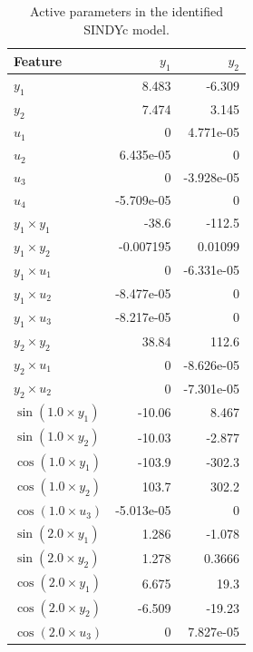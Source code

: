 \documentclass[../main.tex]{subfiles}
\begin{document}
\begin{table}[ht]
\label{tab:sindy_params}
\centering
\begin{tabular}{l r r}
\hline
\textbf{Feature} & \textbf{$y_1$} & \textbf{$y_2$} \\
\hline
$y_1$ & 8.483 & -6.309 \\
$y_2$ & 7.474 & 3.145 \\
$u_1$ & 0 & 4.771e-05 \\
$u_2$ & 6.435e-05 & 0 \\
$u_3$ & 0 & -3.928e-05 \\
$u_4$ & -5.709e-05 & 0 \\
$y_1 \times y_1$ & -38.6 & -112.5 \\
$y_1 \times y_2$ & -0.007195 & 0.01099 \\
$y_1 \times u_1$ & 0 & -6.331e-05 \\
$y_1 \times u_2$ & -8.477e-05 & 0 \\
$y_1 \times u_3$ & -8.217e-05 & 0 \\
$y_2 \times y_2$ & 38.84 & 112.6 \\
$y_2 \times u_1$ & 0 & -8.626e-05 \\
$y_2 \times u_2$ & 0 & -7.301e-05 \\
$\sin(1.0 \times y_1)$ & -10.06 & 8.467 \\
$\sin(1.0 \times y_2)$ & -10.03 & -2.877 \\
$\cos(1.0 \times y_1)$ & -103.9 & -302.3 \\
$\cos(1.0 \times y_2)$ & 103.7 & 302.2 \\
$\cos(1.0 \times u_3)$ & -5.013e-05 & 0 \\
$\sin(2.0 \times y_1)$ & 1.286 & -1.078 \\
$\sin(2.0 \times y_2)$ & 1.278 & 0.3666 \\
$\cos(2.0 \times y_1)$ & 6.675 & 19.3 \\
$\cos(2.0 \times y_2)$ & -6.509 & -19.23 \\
$\cos(2.0 \times u_3)$ & 0 & 7.827e-05 \\
\end{tabular}
\caption{Active parameters in the identified SINDYc model. \vspace{-2em} }
\vspace{-2mm}
\end{table}



\ifSubfilesClassLoaded{%
  
  
}{}
\end{document}
